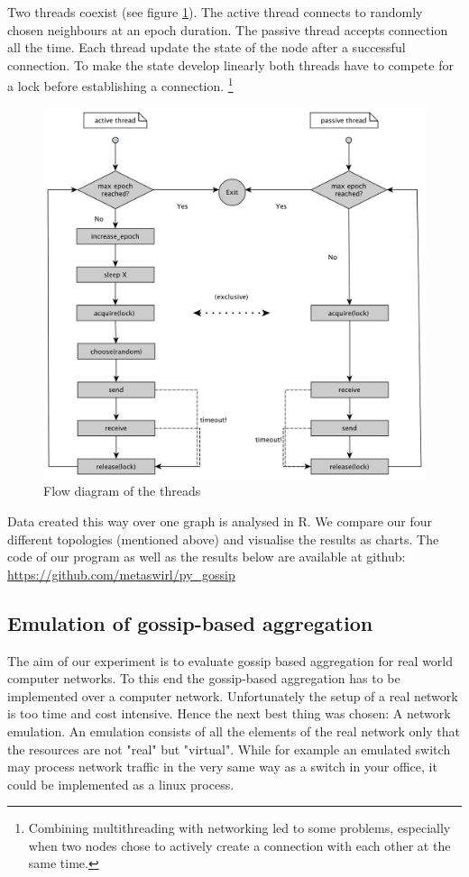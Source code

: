 Two threads coexist (see figure \ref{fig:flow_diag}). The active thread connects to randomly chosen neighbours at an epoch duration. The passive thread accepts connection all the time. Each thread update the state of the node after a successful connection. To make the state develop linearly both threads have to compete for a lock before establishing a connection. \footnote{Combining multithreading with networking led to some problems, especially when two nodes chose to actively create a connection with each other at the same time.}
\begin{figure}[h!]
    \begin{center}
        \includegraphics[scale=0.25]{flow_diag.jpg}
    \end{center}
    \caption{Flow diagram of the threads}
    \label{fig:flow_diag}
\end{figure}

Data created this way over one graph is analysed in R. We compare our four different topologies (mentioned above) and visualise the results as charts. The code of our program as well as the results below are available at github: \url{https://github.com/metaswirl/py_gossip}

\subsection{Emulation of gossip-based aggregation}
The aim of our experiment is to evaluate gossip based aggregation for real world computer networks. To this end the gossip-based aggregation has to be implemented over a computer network. Unfortunately the setup of a real network is too time and cost intensive. Hence the next best thing was chosen: A network emulation. 
An emulation consists of all the elements of the real network only that the resources are not "real" but "virtual". While for example an emulated switch may process network traffic in the very same way as a switch in your office, it could be implemented as a linux process.

